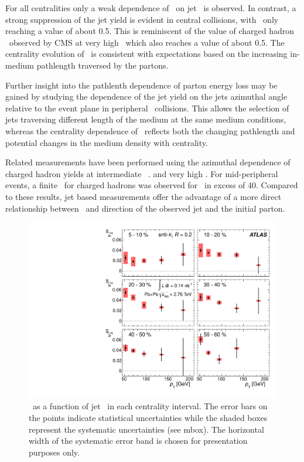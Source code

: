 For all centralities only a weak dependence of \Rcp\ on jet \pT\ is observed. 
In contrast, a strong suppression of the jet yield is evident in
central collisions, with \Rcp\ only reaching a value of about 0.5. 
This is reminiscent of the value of charged hadron \Raa\ observed 
by CMS at very high \pT\, which also reaches a value of about 0.5.
The centrality evolution of \Rcp\ is consistent with expectations
based on the increasing in-medium pathlength traversed by the partons.

Further insight into the pathlenth dependence of parton energy 
loss may be gained by studying the dependence of the jet yield
on the jets azimuthal angle relative to the event plane
in peripheral \PbPb\ collisions. This allows the selection of jets 
traversing different length of the medium at the same medium 
conditions, whereas the centrality dependence of \Rcp\ reflects 
both the changing pathlength and potential changes in the medium
density with centrality.

Related measurements have been performed using the azimuthal dependence 
of charged hadron yields at intermediate \pT\
\cite{Adams:2004wz,Adler:2006bw,Adare:2010sp, ATLAS:2011ah, Abelev:2012di}. 
and very high \pt \cite{Chatrchyan:2012xq}. For mid-peripheral events,
a finite \vtwo\ for charged hadrons was observed for \pT\ in excess of 40\GeVc.
Compared to these results, jet based measurements offer the advantage
of a more direct relationship between \pT\ and direction of the observed 
jet and the initial parton.

\begin{figure}[!h]
\begin{center}
\includegraphics[width=0.49\mboxwidth]{jetfigures/ATLAS_jetv2.pdf}
\caption{\vtjet\ as a function of jet \pTjet\ in each centrality
   interval. The error bars on the points indicate statistical
   uncertainties while the shaded boxes represent the systematic
   uncertainties (see mbox). The horizontal width of the systematic
   error band is chosen for presentation purposes only. }
\label{fig:GR:ATLAS_jet_v2}
\end{center}
\end{figure}

